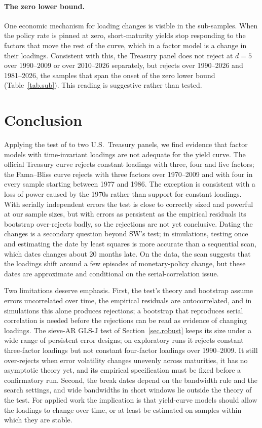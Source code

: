 \documentclass[11pt]{article}
\begin{document}
\paragraph{The zero lower bound.} One economic mechanism for loading changes is visible in the sub-samples. When the policy rate is pinned at zero, short-maturity yields stop responding to the factors that move the rest of the curve, which in a factor model is a change in their loadings. Consistent with this, the Treasury panel does not reject at $d=5$ over 1990--2009 or over 2010--2026 separately, but rejects over 1990--2026 and 1981--2026, the samples that span the onset of the zero lower bound (Table~\ref{tab.sub}). This reading is suggestive rather than tested.

\section{Conclusion}\label{sec.conclusion}

Applying the test of \citet{SuWang2017} to two U.S.\ Treasury panels, we find evidence that factor models with time-invariant loadings are not adequate for the yield curve. The official Treasury curve rejects constant loadings with three, four and five factors; the Fama--Bliss curve rejects with three factors over 1970--2009 and with four in every sample starting between 1977 and 1986. The exception is consistent with a loss of power caused by the 1970s rather than support for constant loadings. With serially independent errors the test is close to correctly sized and powerful at our sample sizes, but with errors as persistent as the empirical residuals its bootstrap over-rejects badly, so the rejections are not yet conclusive. Dating the changes is a secondary question beyond SW's test; in simulations, testing once and estimating the date by least squares is more accurate than a sequential scan, which dates changes about 20 months late. On the data, the scan suggests that the loadings shift around a few episodes of monetary-policy change, but these dates are approximate and conditional on the serial-correlation issue.

Two limitations deserve emphasis. First, the test's theory and bootstrap assume errors uncorrelated over time, the empirical residuals are autocorrelated, and in simulations this alone produces rejections; a bootstrap that reproduces serial correlation is needed before the rejections can be read as evidence of changing loadings. The sieve-AR GLS-J test of Section~\ref{sec.robust} keeps its size under a wide range of persistent error designs; on exploratory runs it rejects constant three-factor loadings but not constant four-factor loadings over 1990--2009. It still over-rejects when error volatility changes unevenly across maturities, it has no asymptotic theory yet, and its empirical specification must be fixed before a confirmatory run. Second, the break dates depend on the bandwidth rule and the search settings, and wide bandwidths in short windows lie outside the theory of the test. For applied work the implication is that yield-curve models should allow the loadings to change over time, or at least be estimated on samples within which they are stable.
\end{document}
